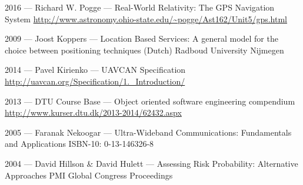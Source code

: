 \begin{thebibliography}{3}
    2016 --- Richard W. Pogge --- Real-World Relativity: The GPS Navigation System
    \url{http://www.astronomy.ohio-state.edu/~pogge/Ast162/Unit5/gps.html}

    2009 --- Joost Koppers --- Location Based Services: A general model for the choice between positioning techniques (Dutch)
    Radboud University Nijmegen

	2014 --- Pavel Kirienko --- UAVCAN Specification
	\url{http://uavcan.org/Specification/1._Introduction/}

    2013 --- DTU Course Base --- Object oriented software engineering compendium
    \url{http://www.kurser.dtu.dk/2013-2014/62432.aspx}

    2005 --- Faranak Nekoogar --- Ultra-Wideband Communications: Fundamentals and Applications
	ISBN-10: 0-13-146326-8

    2004 --- David Hillson \& David Hulett  --- Assessing Risk Probability: Alternative Approaches
    PMI Global Congress Proceedings

\end{thebibliography}
